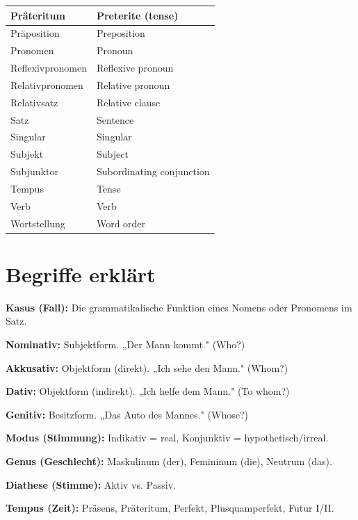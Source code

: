 \begin{center}
\begin{tabular}{|l|l|}
Präteritum & Preterite (tense) \\ \hline
Präposition & Preposition \\ \hline
Pronomen & Pronoun \\ \hline
Reflexivpronomen & Reflexive pronoun \\ \hline
Relativpronomen & Relative pronoun \\ \hline
Relativsatz & Relative clause \\ \hline
Satz & Sentence \\ \hline
Singular & Singular \\ \hline
Subjekt & Subject \\ \hline
Subjunktor & Subordinating conjunction \\ \hline
Tempus & Tense \\ \hline
Verb & Verb \\ \hline
Wortstellung & Word order \\ \hline
\end{tabular}
\end{center}

\section{Begriffe erklärt}

\bigskip
\noindent\textbf{Kasus (Fall):} Die grammatikalische Funktion eines Nomens oder Pronomens im Satz.

\bigskip
\noindent\textbf{Nominativ:} Subjektform. „Der Mann kommt." (Who?)

\bigskip
\noindent\textbf{Akkusativ:} Objektform (direkt). „Ich sehe den Mann." (Whom?)

\bigskip
\noindent\textbf{Dativ:} Objektform (indirekt). „Ich helfe dem Mann." (To whom?)

\bigskip
\noindent\textbf{Genitiv:} Besitzform. „Das Auto des Mannes." (Whose?)

\bigskip
\noindent\textbf{Modus (Stimmung):} Indikativ = real, Konjunktiv = hypothetisch/irreal.

\bigskip
\noindent\textbf{Genus (Geschlecht):} Maskulinum (der), Femininum (die), Neutrum (das).

\bigskip
\noindent\textbf{Diathese (Stimme):} Aktiv vs. Passiv.

\bigskip
\noindent\textbf{Tempus (Zeit):} Präsens, Präteritum, Perfekt, Plusquamperfekt, Futur I/II.

\chapterend